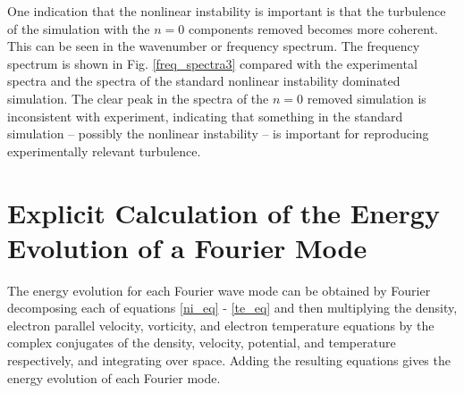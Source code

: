 \documentclass[12pt]{article}
\begin{document}
One indication that the nonlinear instability is important is that the turbulence of the simulation with the $n=0$ components removed becomes more coherent. This can be seen in the
wavenumber or frequency spectrum. The frequency spectrum is shown in Fig. \ref{freq_spectra3} compared with the experimental spectra and the spectra of the standard nonlinear instability
dominated simulation. The clear peak in the spectra of the $n=0$ removed simulation is inconsistent with experiment, indicating that something in the standard simulation -- possibly
the nonlinear instability -- is important for reproducing experimentally relevant turbulence.




\appendix

\section{Explicit Calculation of the Energy Evolution of a Fourier Mode}

The energy evolution for each Fourier wave mode can be obtained by Fourier decomposing each of equations \ref{ni_eq} - \ref{te_eq}
and then multiplying the density, electron parallel velocity, vorticity, and electron temperature equations by the complex conjugates of the 
density, velocity, potential, and temperature respectively, and integrating over space.
Adding the resulting equations gives the energy evolution of each Fourier mode.
\end{document}

